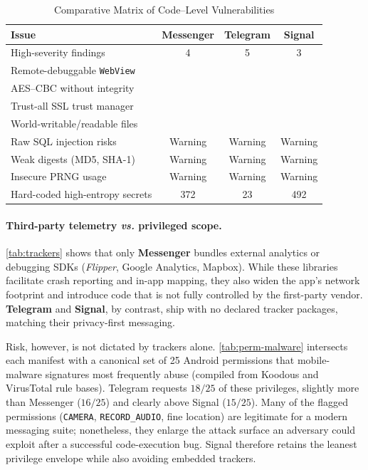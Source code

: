 \documentclass[a4paper,12pt]{report}
\newcommand{\cmark}{\ding{51}} %
\newcommand{\xmark}{\ding{55}} %
\begin{document}
\begin{table}[htbp]
  \centering
  \caption{Comparative Matrix of Code--Level Vulnerabilities}
  \label{tab:code-vuln}
  \begin{tabular}{|p{6.1cm}|c|c|c|}
    \hline
    \textbf{Issue} & \textbf{Messenger} & \textbf{Telegram} & \textbf{Signal} \\ \hline
    High-severity findings              & 4           & 5           & 3           \\ \hline
    Remote-debuggable \texttt{WebView}  & \cmark      & \cmark      & \xmark      \\ \hline
    AES--CBC without integrity          & \cmark      & \cmark      & \cmark      \\ \hline
    Trust-all SSL trust manager         & \xmark      & \xmark      & \cmark      \\ \hline
    World-writable/readable files       & \cmark      & \xmark      & \xmark      \\ \hline
    Raw SQL injection risks             & Warning     & Warning     & Warning     \\ \hline
    Weak digests (MD5, SHA-1)           & Warning     & Warning     & Warning     \\ \hline
    Insecure PRNG usage                 & Warning     & Warning     & Warning     \\ \hline
    Hard-coded high-entropy secrets     & 372         & 23          & 492         \\ \hline
  \end{tabular}
\end{table}

\paragraph{Third-party telemetry \emph{vs.} privileged scope.}%
\label{sec:trackers-vs-perms}

\autoref{tab:trackers} shows that only \textbf{Messenger} bundles external
analytics or debugging SDKs (\emph{Flipper}, Google Analytics, Mapbox).  While
these libraries facilitate crash reporting and in-app mapping, they also widen
the app’s network footprint and introduce code that is not fully controlled by
the first-party vendor.  \textbf{Telegram} and \textbf{Signal}, by contrast,
ship with no declared tracker packages, matching their privacy-first messaging.

Risk, however, is not dictated by trackers alone.  \autoref{tab:perm-malware}
intersects each manifest with a canonical set of 25 Android permissions that
mobile-malware signatures most frequently abuse (compiled from Koodous and
VirusTotal rule bases).  Telegram requests \(18\!/25\) of these privileges,
slightly more than Messenger (\(16\!/25\)) and clearly above Signal
(\(15\!/25\)).  Many of the flagged permissions (\texttt{CAMERA},
\texttt{RECORD\_AUDIO}, fine location) are legitimate for a modern messaging
suite; nonetheless, they enlarge the attack surface an adversary could exploit
after a successful code-execution bug.  Signal therefore retains the leanest
privilege envelope while also avoiding embedded trackers.
\end{document}
